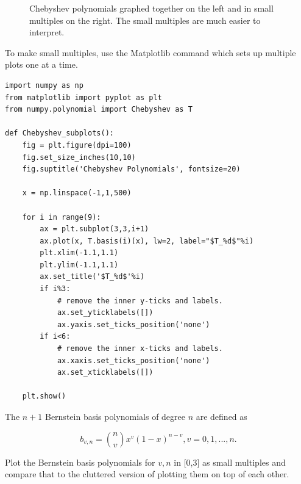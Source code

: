 \begin{figure}
\begin{subfigure}{.45\textwidth}
\end{subfigure}
\caption{Chebyshev polynomials graphed together on the left and in small multiples on the right.
The small multiples are much easier to interpret.}
\label{fig:PoT}
\end{figure}

To make small multiples, use the Matplotlib command  which sets up multiple plots one at a time.

\begin{lstlisting}
import numpy as np
from matplotlib import pyplot as plt
from numpy.polynomial import Chebyshev as T

def Chebyshev_subplots():
    fig = plt.figure(dpi=100)
    fig.set_size_inches(10,10)
    fig.suptitle('Chebyshev Polynomials', fontsize=20)

    x = np.linspace(-1,1,500)

    for i in range(9):
        ax = plt.subplot(3,3,i+1)
        ax.plot(x, T.basis(i)(x), lw=2, label="$T_%d$"%i)
        plt.xlim(-1.1,1.1)
        plt.ylim(-1.1,1.1)
        ax.set_title('$T_%d$'%i)
        if i%3:
            # remove the inner y-ticks and labels.
            ax.set_yticklabels([])
            ax.yaxis.set_ticks_position('none')
        if i<6:
            # remove the inner x-ticks and labels.
            ax.xaxis.set_ticks_position('none')
            ax.set_xticklabels([])

    plt.show()
\end{lstlisting}

\begin{problem} %
The $n+1$ Bernstein basis polynomials of degree $n$ are defined as

$$b_{v,n} = {{n} \choose {v}} x^v (1-x)^{n-v}, v = 0, 1,..., n.$$

Plot the Bernstein basis polynomials for $v,n$ in [0,3] as small multiples and compare that to the cluttered version of plotting them on top of each other.
\end{problem}

